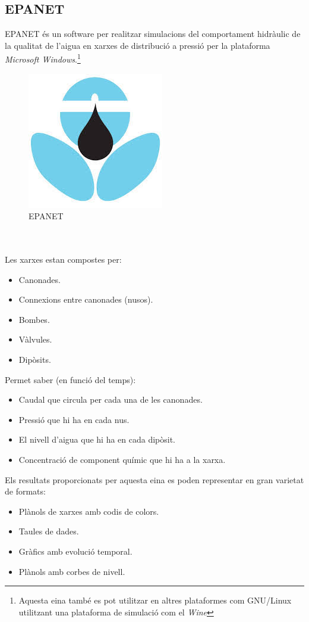 \documentclass[12pt]{article}
\begin{document}
\subsection{EPANET}
EPANET és un software per realitzar simulacions del comportament hidràulic de la qualitat de l'aigua en xarxes de distribució a pressió per la plataforma \textit{Microsoft Windows}.\footnote{Aquesta eina també es pot utilitzar en altres plataformes com GNU/Linux utilitzant una plataforma de simulació com el \textit{Wine}}
\begin{figure}[h!]
	\centering
	\includegraphics[scale=0.5]{imatges/epanet.jpeg}
	\caption{EPANET}
\end{figure}
\\\\Les xarxes estan compostes per:
\begin{itemize}
	\item Canonades.
	\item Connexions entre canonades (nusos).
	\item Bombes.
	\item Vàlvules.
	\item Dipòsits.
\end{itemize}
\vspace{0.5cm}Permet saber (en funció del temps):
\begin{itemize}
	\item Caudal que circula per cada una de les canonades.
	\item Pressió que hi ha en cada nus.
	\item El nivell d'aigua que hi ha en cada dipòsit.
	\item Concentració de component químic que hi ha a la xarxa.
\end{itemize}
\vspace{0.5cm}Els resultats proporcionats per aquesta eina es poden representar en gran varietat de formats:
\begin{itemize}
	\item Plànols de xarxes amb codis de colors.
	\item Taules de dades.
	\item Gràfics amb evolució temporal.
	\item Plànols amb corbes de nivell.
\end{itemize}
\end{document}
